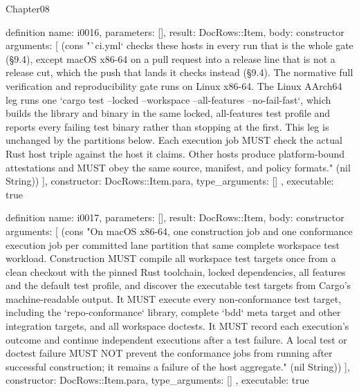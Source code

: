 \begin{lexlean}{Chapter08}
\begin{semanticmodule}
definition{
  name: i0016,
  parameters: [],
  result: DocRows::Item,
  body: constructor{
    arguments: [
      (cons "`ci.yml` checks these hosts in every run that is the whole gate (§9.4), except macOS x86-64 on a pull request into a release line that is not a release cut, which the push that lands it checks instead (§9.4). The normative full verification and reproducibility gate runs on Linux x86-64. The Linux AArch64 leg runs one `cargo test --locked --workspace --all-features --no-fail-fast`, which builds the library and binary in the same locked, all-features test profile and reports every failing test binary rather than stopping at the first. This leg is unchanged by the partitions below. Each execution job MUST check the actual Rust host triple against the host it claims. Other hosts produce platform-bound attestations and MUST obey the same source, manifest, and policy formats." (nil String))
    ],
    constructor: DocRows::Item.para,
    type_arguments: []
  },
  executable: true
}

definition{
  name: i0017,
  parameters: [],
  result: DocRows::Item,
  body: constructor{
    arguments: [
      (cons "On macOS x86-64, one construction job and one conformance execution job per committed lane partition that same complete workspace test workload. Construction MUST compile all workspace test targets once from a clean checkout with the pinned Rust toolchain, locked dependencies, all features and the default test profile, and discover the executable test targets from Cargo's machine-readable output. It MUST execute every non-conformance test target, including the `repo-conformance` library, complete `bdd` meta target and other integration targets, and all workspace doctests. It MUST record each execution's outcome and continue independent executions after a test failure. A local test or doctest failure MUST NOT prevent the conformance jobs from running after successful construction; it remains a failure of the host aggregate." (nil String))
    ],
    constructor: DocRows::Item.para,
    type_arguments: []
  },
  executable: true
}


\end{semanticmodule}
\end{lexlean}
